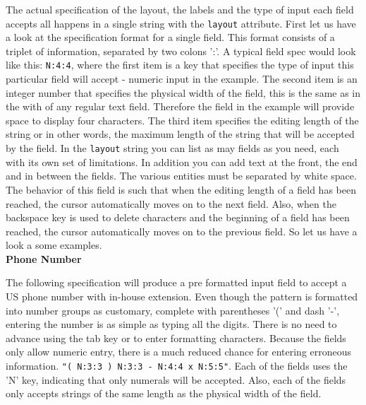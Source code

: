 The actual specification of the layout, the labels and the type of input
each field accepts all happens in a single string with the
\texttt{layout} attribute. First let us have a look at the specification
format for a single field. This format consists of a triplet of
information, separated by two colons ':'. A typical field spec would
look like this: \texttt{N:4:4}, where the first item is a key that
specifies the type of input this particular field will accept - numeric
input in the example. The second item is an integer number that
specifies the physical width of the field, this is the same as in the
with of any regular text field. Therefore the field in the example will
provide space to display four characters. The third item specifies the
editing length of the string or in other words, the maximum length of
the string that will be accepted by the field. In the \texttt{layout}
string you can list as may fields as you need, each with its own set of
limitations. In addition you can add text at the front, the end and in
between the fields. The various entities must be separated by white
space. The behavior of this field is such that when the editing length
of a field has been reached, the cursor automatically moves on to the
next field. Also, when the backspace key is used to delete characters
and the beginning of a field has been reached, the cursor automatically
moves on to the previous field. So let us have a look a some examples.\\

\textbf{Phone Number}

The following specification will produce a pre formatted input field to
accept a US phone number with in-house extension. Even though the
pattern is formatted into number groups as customary, complete with
parentheses '(' and dash '-', entering the number is as simple as typing
all the digits. There is no need to advance using the tab key or to enter
formatting characters. Because the fields only allow numeric entry, there
is a much reduced chance for entering erroneous information.
\texttt{"( N:3:3 ) N:3:3 - N:4:4 x N:5:5"}. Each of the fields uses the
'N' key, indicating that only numerals will be accepted. Also, each of
the fields only accepts strings of the same length as the physical width
of the field.\\

\begin{center}
\end{center}

